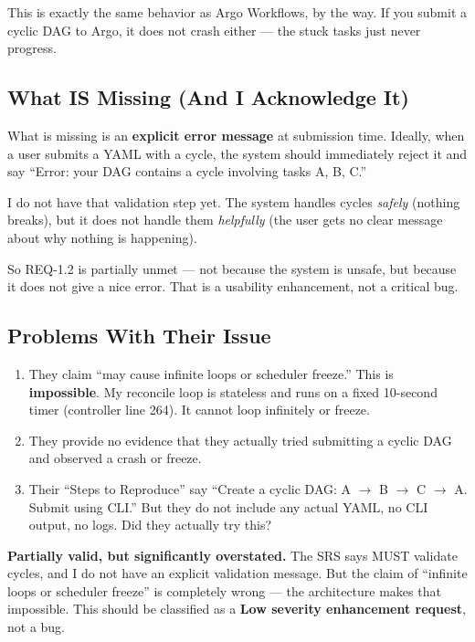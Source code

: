 \documentclass[12pt,a4paper]{article}
\begin{document}
This is exactly the same behavior as Argo Workflows, by the way. If you submit a cyclic DAG to Argo, it does not crash either --- the stuck tasks just never progress.

\subsection{What IS Missing (And I Acknowledge It)}

What is missing is an \textbf{explicit error message} at submission time. Ideally, when a user submits a YAML with a cycle, the system should immediately reject it and say ``Error: your DAG contains a cycle involving tasks A, B, C.''

I do not have that validation step yet. The system handles cycles \textit{safely} (nothing breaks), but it does not handle them \textit{helpfully} (the user gets no clear message about why nothing is happening).

So REQ-1.2 is partially unmet --- not because the system is unsafe, but because it does not give a nice error. That is a usability enhancement, not a critical bug.

\subsection{Problems With Their Issue}

\begin{enumerate}
  \item They claim ``may cause infinite loops or scheduler freeze.'' This is \textbf{impossible}. My reconcile loop is stateless and runs on a fixed 10-second timer (controller line 264). It cannot loop infinitely or freeze.
  \item They provide no evidence that they actually tried submitting a cyclic DAG and observed a crash or freeze.
  \item Their ``Steps to Reproduce'' say ``Create a cyclic DAG: A $\to$ B $\to$ C $\to$ A. Submit using CLI.'' But they do not include any actual YAML, no CLI output, no logs. Did they actually try this?
\end{enumerate}

\begin{verdictbox}
\textbf{Partially valid, but significantly overstated.} The SRS says MUST validate cycles, and I do not have an explicit validation message. But the claim of ``infinite loops or scheduler freeze'' is completely wrong --- the architecture makes that impossible. This should be classified as a \textbf{Low severity enhancement request}, not a bug.
\end{verdictbox}
\end{document}
